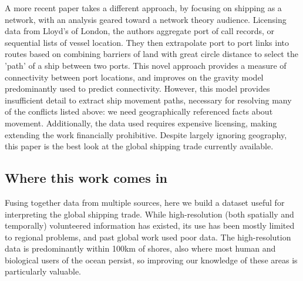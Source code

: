 A more recent paper \citep{Kaluza2010} takes a different approach, by focusing on shipping as a network, with an analysis geared toward a network theory audience. Licensing data from Lloyd's of London, %
 the authors aggregate port of call records, or sequential lists of vessel location. They then extrapolate port to port links into routes based on combining barriers of land with great circle distance to select the 'path' of a ship between two ports. This novel approach provides a measure of connectivity between port locations, and improves on the gravity model predominantly used to predict connectivity. %
However, this model provides insufficient detail to extract ship movement paths, necessary for resolving many of the conflicts listed above: we need geographically referenced facts about movement. Additionally, the data used requires expensive licensing, making extending the work financially prohibitive. Despite largely ignoring geography, this paper is the best look at the global shipping trade currently available.



\subsection{Where this work comes in}

Fusing together data from multiple sources, here we build a dataset useful for interpreting the global shipping trade. While high-resolution (both spatially and temporally) volunteered information has existed, its use has been mostly limited to regional problems, and past global work \citep{Corbett2007, Halpern2008} used poor data. The high-resolution data is predominantly within 100km of shores, also where most human and biological users of the ocean persist, so improving our knowledge of these areas is particularly valuable.

